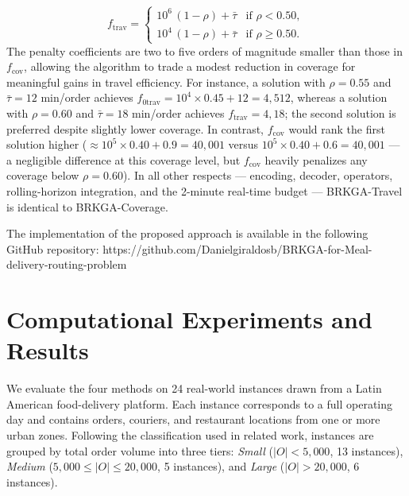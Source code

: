 \documentclass[runningheads]{llncs}
\begin{document}
{\small
\begin{equation*}
    f_{\text{trav}} =
    \begin{cases}
        10^{6}\,(1 - \rho) + \bar{\tau} & \text{if } \rho < 0.50, \\
        10^{4}\,(1 - \rho) + \bar{\tau} & \text{if } \rho \geq 0.50.
    \end{cases}
\end{equation*}
}
The penalty coefficients are two to five orders of magnitude smaller than those in $f_{\text{cov}}$, allowing the algorithm to trade a modest reduction in coverage for meaningful gains in travel efficiency. For instance, a solution with $\rho = 0.55$ and $\bar{\tau} = 12$ min/order achieves $f_{0\text{trav}} = 10^4 \times 0.45 + 12 = 4{,}512$, whereas a solution with $\rho = 0.60$ and $\bar{\tau} = 18$ min/order achieves $f_{\text{trav}} = 4{,}18$; the second solution is preferred despite slightly lower coverage. In contrast, $f_{\text{cov}}$ would rank the first solution higher ($\approx 10^5 \times 0.40 + 0.9 = 40{,}001$ versus $10^5 \times 0.40 + 0.6 = 40{,}001$ — a negligible difference at this coverage level, but
$f_{\text{cov}}$ heavily penalizes any coverage below $\rho = 0.60$). In all other respects — encoding, decoder, operators, rolling-horizon integration, and the 2-minute real-time budget — BRKGA-Travel is identical to BRKGA-Coverage.

The implementation of the proposed approach is available in the following GitHub repository: https://github.com/Danielgiraldosb/BRKGA-for-Meal-delivery-routing-problem

\vspace{-10pt}
\section{Computational Experiments and Results}\label{sec:results}
\vspace{-10pt}

We evaluate the four methods on 24 real-world instances drawn from a Latin American food-delivery platform. Each instance corresponds to a full operating day and
contains orders, couriers, and restaurant locations from one or more urban zones.
Following the classification used in related work, instances are grouped by total order volume into three tiers: \emph{Small} ($|O| < 5{,}000$, 13 instances), \emph{Medium} ($5{,}000 \leq |O| \leq 20{,}000$, 5 instances), and \emph{Large} ($|O| > 20{,}000$, 6 instances).
\end{document}
